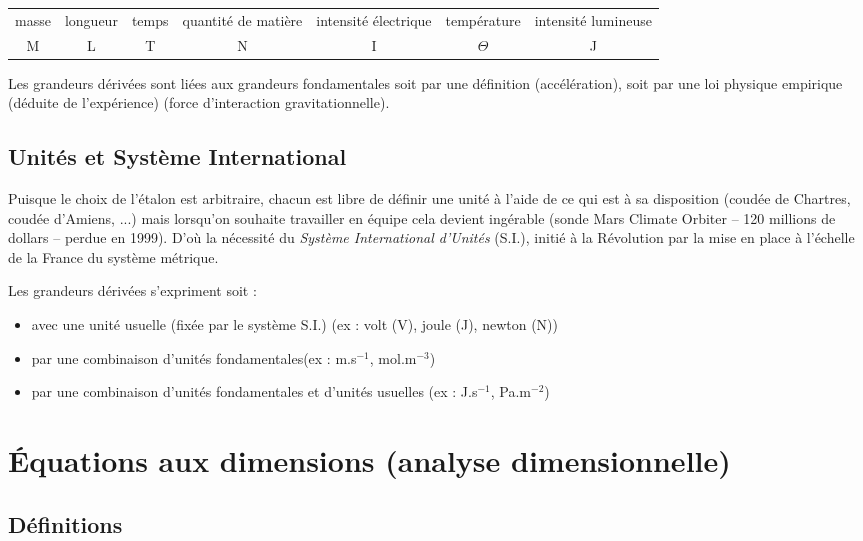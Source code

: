\documentclass[MPSI]{tp}
\begin{document}
\begin{center}
 \begin{tabular}{@{}ccccccc@{}}
\toprule
masse & longueur & temps & quantité de matière & intensité électrique & température & intensité lumineuse \\ 
M & L & T & N & I & $\Theta$ &J \\ 
\bottomrule 
  
\end{tabular} 
\end{center}


Les grandeurs dérivées sont liées aux grandeurs fondamentales soit par une définition (\ex accélération), soit par une loi physique empirique (\ie déduite de l'expérience) (\ex force d'interaction gravitationnelle).


\subsection{Unités et Système International}

\indent Puisque le choix de l'étalon est arbitraire, chacun est libre de définir une unité à l'aide de ce qui est à sa disposition (\ex coudée de Chartres, coudée d'Amiens, ...) mais lorsqu'on souhaite travailler en équipe cela devient ingérable (\ex sonde Mars Climate Orbiter -- 120 millions de dollars -- perdue en 1999). D'où la nécessité du \emph{Système International d'Unités} (S.I.), initié à la Révolution par la mise en place à l'échelle de la France du système métrique.

\indent Les grandeurs dérivées s'expriment soit :
\begin{itemize}
\item avec une unité usuelle (fixée par le système S.I.) (ex : volt (V), joule (J), newton (N))
\item par une combinaison d'unités fondamentales(ex : m.s$^{-1}$, mol.m$^{-3}$)
\item par une combinaison d'unités fondamentales et d'unités usuelles (ex : J.s$^{-1}$, Pa.m$^{-2}$)
\end{itemize}


\section{\'Equations aux dimensions (analyse dimensionnelle)}\label{Sec_Equations_dimensions}

\subsection{Définitions}
\end{document}
